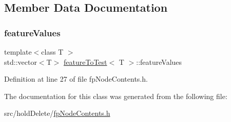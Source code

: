 \subsection{Member Data Documentation}
\mbox{\label{classfeatureToTest_a59fefb4d5b41187ab0d2b7de0f48076d}} 
\subsubsection{\texorpdfstring{feature\+Values}{featureValues}}
{\footnotesize\ttfamily template$<$class T $>$ \\
std\+::vector$<$T$>$ \hyperlink{classfeatureToTest}{feature\+To\+Test}$<$ T $>$\+::feature\+Values\hspace{0.3cm}{\ttfamily [private]}}



Definition at line 27 of file fp\+Node\+Contents.\+h.



The documentation for this class was generated from the following file\+:\begin{DoxyCompactItemize}
\item 
src/hold\+Delete/\hyperlink{fpNodeContents_8h}{fp\+Node\+Contents.\+h}\end{DoxyCompactItemize}
